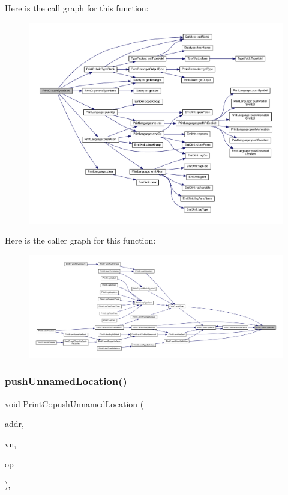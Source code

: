 Here is the call graph for this function\+:
\nopagebreak
\begin{figure}[H]
\begin{center}
\leavevmode
\includegraphics[width=350pt]{class_print_c_a0b96904bf7b1ecfb6b254c51707ae21a_cgraph}
\end{center}
\end{figure}
Here is the caller graph for this function\+:
\nopagebreak
\begin{figure}[H]
\begin{center}
\leavevmode
\includegraphics[width=350pt]{class_print_c_a0b96904bf7b1ecfb6b254c51707ae21a_icgraph}
\end{center}
\end{figure}
\mbox{\label{class_print_c_a5d9f2db7f218e2e994b741940155db52}} 
\subsubsection{\texorpdfstring{pushUnnamedLocation()}{pushUnnamedLocation()}}
{\footnotesize\ttfamily void Print\+C\+::push\+Unnamed\+Location (\begin{DoxyParamCaption}\item[{const \mbox{\hyperlink{class_address}{Address}} \&}]{addr,  }\item[{const \mbox{\hyperlink{class_varnode}{Varnode}} $\ast$}]{vn,  }\item[{const \mbox{\hyperlink{class_pcode_op}{Pcode\+Op}} $\ast$}]{op }\end{DoxyParamCaption})\hspace{0.3cm}{\ttfamily [protected]}, {\ttfamily [virtual]}}




